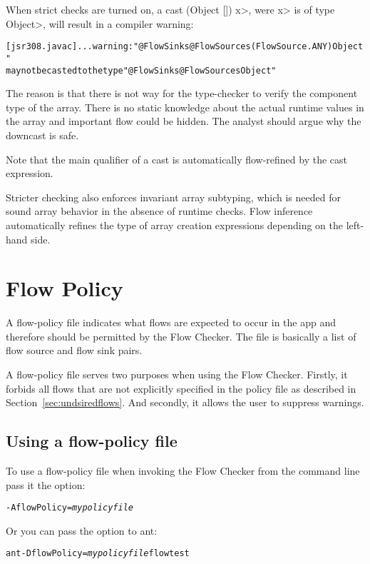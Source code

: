 When strict checks are turned on,
a cast \<(Object []) x>, were \<x> is of type \<Object>, will result
in a compiler warning:

\begin{alltt}
[jsr308.javac] ... warning: "@FlowSinks @FlowSources({FlowSource.ANY}) Object"
       may not be casted to the type "@FlowSinks @FlowSources Object"
\end{alltt}

The reason is that there is not way for the type-checker to verify
 the component type of the array. There is no static knowledge about the actual
runtime values in the array and important flow could be hidden.
The analyst should argue why the downcast is safe.

Note that the main qualifier of a cast is automatically flow-refined
by the cast expression.


\medskip

Stricter checking also enforces invariant array subtyping, which is
needed for sound array behavior in the absence of runtime checks.
Flow inference automatically refines the type of array creation
expressions depending on the left-hand side.

\section{Flow Policy}
\label{sec:flowpolicy}

A flow-policy file indicates what flows are expected to occur in the app
 and therefore should be permitted by the Flow Checker.  The file is basically a list 
 of flow source and flow sink pairs.

A flow-policy file serves two purposes when using the Flow Checker.
Firstly, it forbids all flows that are not explicitly specified in the policy file as described
in Section~\ref{sec:undsiredflows}.  And secondly, it allows the user to  
suppress warnings.

\subsection{Using a flow-policy file}
To use a flow-policy file when invoking the Flow Checker from the
command line pass it the option:
\begin{alltt}
-AflowPolicy=\emph{mypolicyfile}
\end{alltt}

Or you can pass the option to ant:
\begin{alltt}
ant -DflowPolicy=\emph{mypolicyfile} flowtest
\end{alltt}

